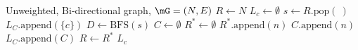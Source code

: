 \begin{algorithm}[h]
    \begin{algorithmic}
         Unweighted, Bi-directional graph, $\mG=(N,E)$
        \STATE {}
        \STATE $R \leftarrow N $
        \STATE $L_c \leftarrow \emptyset $
        \STATE $s \leftarrow R.\text{pop}(~)$
        \STATE $L_C.\text{append}(\{c\})$
        \ELSE
        \STATE $D \leftarrow \text{BFS}(s)$
        \STATE $C \leftarrow \emptyset $
        \STATE $R^* \leftarrow \emptyset$
        \STATE $R^*.\text{append}(n)$
        \ELSE
        \STATE $C.\text{append}(n)$
        \ENDIF
        \ENDFOR
        \STATE $L_C.\text{append}(C)$
        \STATE $R \leftarrow R^*$
        \ENDIF
        \ENDWHILE
        \OUTPUT $L_c$
    \end{algorithmic}
    \caption{DetermineCluster}
\end{algorithm}
